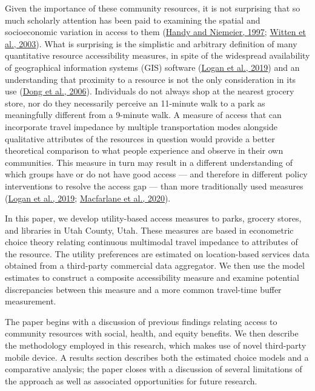 \documentclass[3p, authoryear, review]{elsarticle} %
\begin{document}
Given the importance of these community resources, it is not surprising that
so much scholarly attention has been paid to examining the spatial and
socioeconomic variation in access to them (\protect\hyperlink{ref-handy1997}{Handy and Niemeier, 1997}; \protect\hyperlink{ref-witten2003}{Witten et al., 2003}). What
is surprising is the simplistic and arbitrary definition of many
quantitative resource accessibility measures, in spite of the widespread
availability of geographical information systems (GIS) software (\protect\hyperlink{ref-logan2019}{Logan et al., 2019}) and
an understanding that proximity to a resource is not the only consideration
in its use (\protect\hyperlink{ref-dong2006}{Dong et al., 2006}). Individuals do not always shop at the nearest grocery
store, nor do they necessarily perceive an 11-minute walk to a park as
meaningfully different from a 9-minute walk. A measure of access that can
incorporate travel impedance by multiple transportation modes alongside
qualitative attributes of the resources in question would provide a better
theoretical comparison to what people experience and observe in their own
communities. This measure in turn may result in a different understanding
of which groups have or do not have good access --- and therefore in different
policy interventions to resolve the access gap --- than more traditionally used
measures (\protect\hyperlink{ref-logan2019}{Logan et al., 2019}; \protect\hyperlink{ref-macfarlane2020}{Macfarlane et al., 2020}).

In this paper, we develop utility-based access measures to parks, grocery stores, and
libraries in Utah County, Utah. These measures are based in econometric choice
theory relating continuous multimodal travel impedance to attributes of the
resource. The utility preferences are estimated on location-based services data
obtained from a third-party commercial data aggregator. We then use the model
estimates to construct a composite accessibility measure and examine potential
discrepancies between this measure and a more common travel-time buffer
measurement.

The paper begins with a discussion of previous findings relating access to
community resources with social, health, and equity benefits. We then describe
the methodology employed in this research, which makes use of novel third-party
mobile device. A results section describes both the estimated choice models and
a comparative analysis; the paper closes with a discussion of several
limitations of the approach as well as associated opportunities for future research.
\end{document}
